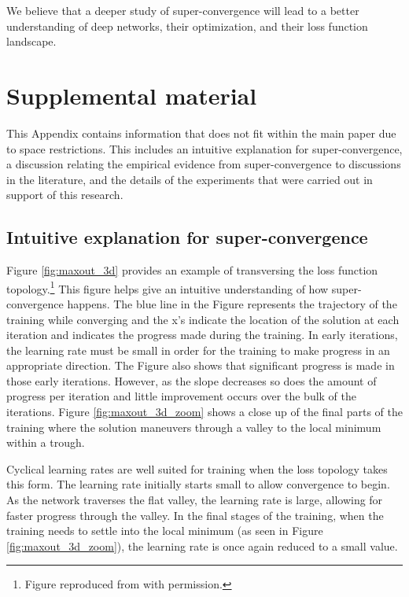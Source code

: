 \documentclass{article}
\begin{document}
We believe that a deeper study of super-convergence will lead to a better understanding of deep networks, their optimization, and their loss function landscape.





	
	\appendix
	
	\section{Supplemental material}
	
	
	This Appendix contains information that does not fit within the main paper due to space restrictions.
	This includes an intuitive explanation for super-convergence, a discussion relating the empirical evidence from super-convergence to discussions in the literature, and the details of the experiments that were carried out in support of this research.
	
	
	\subsection{Intuitive explanation for super-convergence}
	\label{sec:intuitive}
	
	Figure \ref{fig:maxout_3d} provides an example of transversing the loss function topology.\footnote{Figure reproduced from \citet{goodfellow2014qualitatively} with permission.}
	This figure helps give an intuitive understanding of how super-convergence happens.
	The blue line in the Figure represents the trajectory of the training while converging and the x's indicate the location of the solution at each iteration and indicates the progress made during the training.
	In early iterations, the learning rate must be small in order for the training to make progress in an appropriate direction.
	The Figure also shows that significant progress is made in those early iterations.
	However, as the slope decreases so does the amount of progress per iteration and little improvement occurs over the bulk of the iterations.
	Figure \ref{fig:maxout_3d_zoom} shows a close up of the final parts of the training where the solution maneuvers through a valley to the local minimum within a trough.  
	
	Cyclical learning rates are well suited for training when the loss topology takes this form.  
	The learning rate initially starts small to allow convergence to begin.
	As the network traverses the flat valley, the learning rate is large, allowing for faster progress through the valley.
	In the final stages of the training, when the training needs to settle into the local minimum (as seen in Figure \ref{fig:maxout_3d_zoom}), the learning rate is once again reduced to a small value.
	
\end{document}

